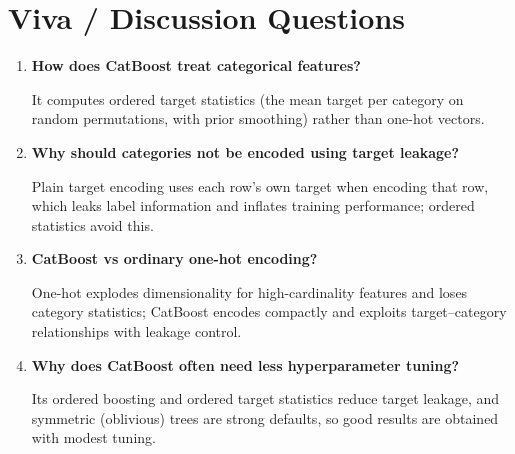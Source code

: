 \section{Viva / Discussion Questions}
\begin{enumerate}
  \item \textbf{How does CatBoost treat categorical features?}\par\nobreak It computes ordered target statistics
  (the mean target per category on random permutations, with prior smoothing) rather than
  one-hot vectors.
  \item \textbf{Why should categories not be encoded using target leakage?}\par\nobreak Plain target encoding uses
  each row's own target when encoding that row, which leaks label information and inflates
  training performance; ordered statistics avoid this.
  \item \textbf{CatBoost vs ordinary one-hot encoding?}\par\nobreak One-hot explodes dimensionality for
  high-cardinality features and loses category statistics; CatBoost encodes compactly and
  exploits target--category relationships with leakage control.
\item \textbf{Why does CatBoost often need less hyperparameter tuning?}\par\nobreak Its ordered boosting and ordered target statistics reduce target leakage, and symmetric (oblivious) trees are strong defaults, so good results are obtained with modest tuning.
\end{enumerate}

